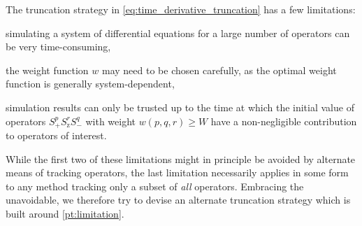 \documentclass[aps,notitlepage,nofootinbib,11pt]{revtex4-1}
\newcommand{\p}[1]{\left(#1\right)} %
\newcommand{\z}{\text{z}}
\newcommand{\1}{\mathds{1}}
\begin{document}
The truncation strategy in \eqref{eq:time_derivative_truncation} has a
few limitations:
\begin{enumerate*}[label=(\roman*)]
\item simulating a system of differential equations for a large number
  of operators can be very time-consuming,
\item the weight function $w$ may need to be chosen carefully, as the
  optimal weight function is generally system-dependent,
\item simulation results can only be trusted up to the time at which
  the initial value of operators $S_+^p S_\z^r S_-^q$ with weight
  $w\p{p,q,r}\ge W$ have a non-negligible contribution to operators of
  interest.\label{pt:limitation}
\end{enumerate*}
While the first two of these limitations might in principle be avoided
by alternate means of tracking operators, the last limitation
necessarily applies in some form to any method tracking only a subset
of {\it all} operators.  Embracing the unavoidable, we therefore try
to devise an alternate truncation strategy which is built around
\ref{pt:limitation}.
\end{document}
